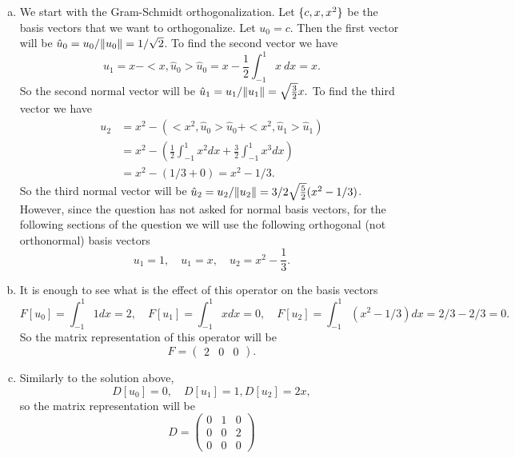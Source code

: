 \begin{solution}
	\begin{enumerate}[(a)]
		\item We start with the Gram-Schmidt orthogonalization. Let $ \{c,x,x^2\} $ be the basis vectors that we want to orthogonalize. Let $ u_0 = c $. Then the first vector will be $ \hat{u}_0 = u_0/\norm{u_0} = 1/\sqrt{2}  $. To find the second vector we have
		\[ u_1 = x - <x,\hat{u}_0>\hat{u}_0 = x - \frac{1}{2}\int_{-1}^{1}x\ dx  = x. \]
		So the second normal vector will be $ \hat{u}_1 = u_1 / \norm{u_1} = \sqrt{\frac{3}{2}}x. $ To find the third vector we have
		\begin{align*}
			u_2 &= x^2 - (<x^2,\hat{u}_0>\hat{u}_0 + <x^2,\hat{u}_1>\hat{u}_1) \\
			&= x^2 - (\frac{1}{2}\int_{-1}^{1}x^2 dx + \frac{3}{2}\int_{-1}^{1}x^3 dx)  \\
			&= x^2 - (1/3 + 0) = x^2 - 1/3.
		\end{align*}
		So the third normal vector will be $ \hat{u}_2 = u_2 / \norm{u_2} = 3/2\sqrt{\frac{5}{2}}(x^2 - 1/3) $. However, since the question has not asked for normal basis vectors, for the following sections of the question we will use the following orthogonal (not orthonormal) basis vectors
		\[ u_1 = 1,\quad u_1 = x,\quad u_2 = x^2 - \frac{1}{3}. \]
		
		\item It is enough to see what is the effect of this operator on the basis vectors
		\[ F[u_0] = \int_{-1}^{1} 1 dx = 2, \quad F[u_1] = \int_{-1}^{1} x dx = 0,\quad F[u_2] = \int_{-1}^{1} (x^2 - 1/3)dx = 2/3 - 2/3 = 0. \]
		So the matrix representation of this operator will be
		\[ F = \begin{pmatrix}
			2 & 0 & 0
		\end{pmatrix}. \]
		
		\item Similarly to the solution above, 
		\[ D[u_0] = 0, \quad D[u_1] = 1, D[u_2] = 2x, \]
		so the matrix representation will be 
		\[ D = \begin{pmatrix}
			0 & 1 & 0 \\
			0 & 0 & 2 \\
			0 & 0 & 0
		\end{pmatrix} \]
	\end{enumerate}
\end{solution}

